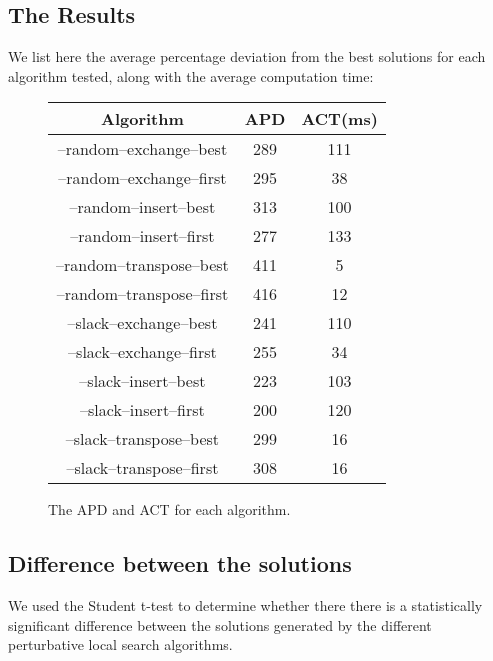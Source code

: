 \subsection{The Results}
We list here the average percentage deviation from the best solutions for each algorithm tested, along with the average computation time:

\begin{figure}[H]
\begin{center}
	\begin{tabular}{|c|c|c|} \hline
		Algorithm & APD & ACT(ms) \\ \hline \hline
		
		--random--exchange--best		& 289	& 111 \\ \hline
		--random--exchange--first	& 295	& 38 \\ \hline
		--random--insert--best		& 313	& 100 \\ \hline
		--random--insert--first		& 277	& 133 \\ \hline
		--random--transpose--best	& 411	& 5 \\ \hline
		--random--transpose--first	& 416	& 12 \\ \hline
		--slack--exchange--best		& 241	& 110 \\ \hline
		--slack--exchange--first		& 255	& 34 \\ \hline
		--slack--insert--best		& 223	& 103 \\ \hline
		--slack--insert--first		& 200	& 120 \\ \hline
		--slack--transpose--best		& 299	& 16 \\ \hline
		--slack--transpose--first	& 308	& 16 \\ \hline
	\end{tabular}
\end{center}
\caption{The APD and ACT for each algorithm.}
\end{figure}

\subsection{Difference between the solutions}
We used the Student t-test to determine whether there there is a statistically significant difference between the solutions generated by the different perturbative local search algorithms.

